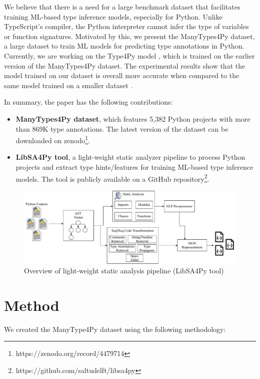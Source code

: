\documentclass[10pt, conference]{IEEEtran}
\begin{document}
We believe that there is a need for a large benchmark dataset that facilitates training ML-based type inference models, especially for Python. Unlike TypeScript's compiler, the Python interpreter cannot infer the type of variables or function signatures. Motivated by this, we present the ManyTypes4Py dataset, a large dataset to train ML models for predicting type annotations in Python. Currently, we are working on the Type4Py model \cite{mir2021type4py}, which is trained on the earlier version of the ManyTypes4Py dataset. The experimental results show that the model trained on our dataset is overall more accurate when compared to the same model trained on a smaller dataset \cite{mir2021type4py}.

In summary, the paper has the following contributions:
\begin{itemize}
	\item \textbf{ManyTypes4Py dataset}, which features 5,382 Python projects with more than 869K type annotations. The latest version of the dataset can be downloaded on zenodo\footnote{https://zenodo.org/record/4479714}.
	\item \textbf{LibSA4Py tool}, a light-weight static analyzer pipeline to process Python projects and extract type hints/features for training ML-based type inference models. The tool is publicly available on a GitHub repository\footnote{https://github.com/saltudelft/libsa4py}.
\end{itemize}


\begin{figure}[!t]
	\centering
	\includegraphics[width=0.8\linewidth]{figs/manytypes4py-pipeline.pdf}
	\caption{Overview of light-weight static analysis pipeline (LibSA4Py tool)}
	\label{fig:overview-pipeline-sa}
\end{figure}

\section{Method}\label{sec:method}
We created the ManyType4Py dataset using the following methodology:
\end{document}
